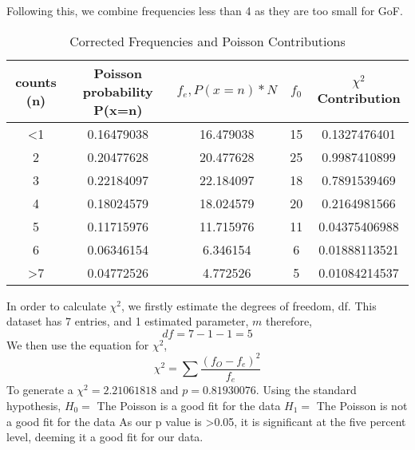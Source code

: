 \documentclass[11pt]{article}
\begin{document}
    Following this, we combine frequencies less than 4 as they are too small for GoF. 
    \begin{table}[h]
        \centering
        \begin{tabular}{|c|c|c|c|c|}
         \hline
           counts (n)  & Poisson probability P(x=n) & $ f_{e}, P(x=n) * N$ & $f_{0}$ & $\chi^{2}$ Contribution\\
 \hline
            <1 & 0.16479038 & 16.479038 & 15 &0.1327476401\\
            2 & 0.20477628 & 20.477628 & 25&0.9987410899\\
            3 & 0.22184097 & 22.184097 & 18&0.7891539469\\
            4 & 0.18024579 & 18.024579 & 20&0.2164981566\\
            5 & 0.11715976 & 11.715976 & 11&0.04375406988\\
            6 & 0.06346154 & 6.346154 & 6 &0.01888113521\\
            >7 & 0.04772526 & 4.772526 & 5 &0.01084214537\\      
 \hline
        \end{tabular}
        \caption{Corrected Frequencies and Poisson Contributions}
        \label{tab:my_label}
    \end{table}
    In order to calculate $\chi^{2}$, we firstly estimate the degrees of freedom, df. This dataset has 7 entries, and 1 estimated parameter, $m$ therefore, 
    $$df = 7 - 1 - 1 = 5$$
    We then use the equation for $\chi^{2}$, 
    $$\chi^{2} = \sum{\frac{(f_{O}-f_{e})^{2}}{f_{e}}}$$
    To generate a $\chi^{2} = 2.21061818$ and $p = 0.81930076$. Using the standard hypothesis,
    \newline
    $H_{0} =$ The Poisson is a good fit for the data
    \newline
    $H_{1} =$ The Poisson is not a good fit for the data
    \newline
    As our p value is >0.05, it is significant at the 
    five percent level, deeming it a good fit for our data. 
     
\end{document}

